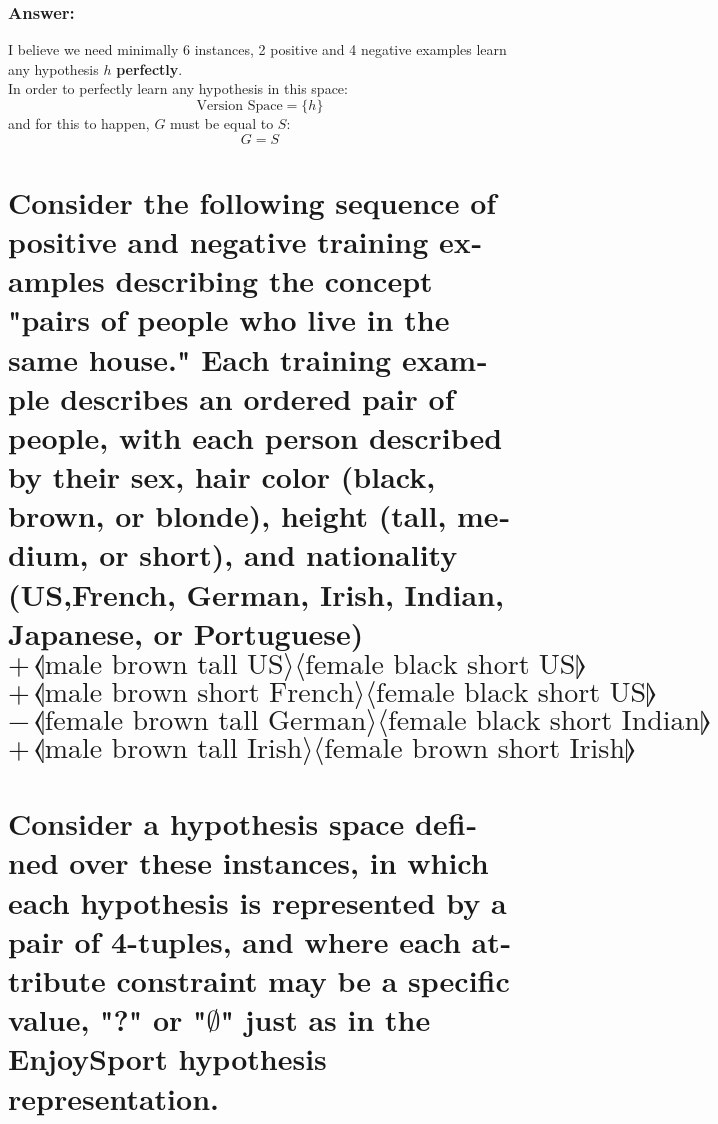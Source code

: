 \documentclass{article}
\newcommand{\ap}[3]{\draw (#1,#2) node[scale=2] {#3};}
\newcommand{\mkrect}[5][black]{%
	\draw[#1,very thick] (#2,#3) rectangle (#4,#5);
}
\newcommand{\mksample}[3]{$$ #3 \hspace{2pt} \llangle \text{#1} \rangle \langle \text{#2} \rrangle $$}
\begin{document}
\begin{latin}
				\subsubsection*{Answer:}
				I believe we need minimally 6 instances, 2 positive and 4 negative examples learn any hypothesis $h$ \textbf{perfectly}.\\
				In order to perfectly learn any hypothesis in this space:
				$$
				\text{Version Space} = \{h\}
				$$
				and for this to happen, $G$ must be equal to $S$:
				$$
				G = S 
				$$
					\begin{figure}[h!]
						\centering
					\end{figure}	
					
		\section{Consider the following sequence of positive and negative training examples
			describing the concept "pairs of people who live in the same house." Each training
			example describes an ordered pair of people, with each person described by their
			sex, hair color (black, brown, or blonde), height (tall, medium, or short), and
			nationality (US,French, German, Irish, Indian, Japanese, or Portuguese)
			\mksample{male brown tall US}{female black short US}{+}
			\mksample{male brown short French}{female black short US}{+}
			\mksample{female brown tall German}{female black short Indian}{-}
			\mksample{male brown tall Irish}{female brown short Irish}{+}\\
			Consider a hypothesis space defined over these instances, in which each hypothesis
			is represented by a pair of 4-tuples, and where each attribute constraint may be a
			specific value, "?" or "$\emptyset$" just as in the EnjoySport hypothesis representation.
			}

\end{latin}
\end{document}
